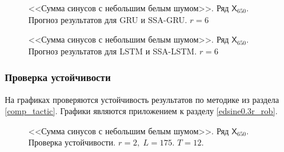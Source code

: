 \documentclass[specialist,
               substylefile = spbu.rtx,
               subf,href,colorlinks=true, 12p]{disser}
\begin{document}
\begin{figure}[H]
	\captionsetup{justification=centering}
	\caption{<<Сумма синусов с небольшим белым шумом>>. Ряд $\mathsf{X}_{650}$. Прогноз результатов для GRU и SSA-GRU. $r = 6$}
	\label{edsin0.3r_r6_res_gru}
\end{figure}

\begin{figure}[H]
	\captionsetup{justification=centering}
	\caption{<<Сумма синусов с небольшим белым шумом>>. Ряд $\mathsf{X}_{650}$. Прогноз результатов для LSTM и SSA-LSTM. $r = 6$}
	\label{edsin0.3r_r6_res_lstm}
\end{figure}

\subsubsection{Проверка устойчивости}
\label{aedsine0.3r_rob}
На графиках проверяются устойчивость результатов по методике из раздела \ref{comp_tactic}. Графики являются приложением к разделу \ref{edsine0.3r_rob}.

\begin{figure}[h]
	\captionsetup{justification=centering}
	\caption{<<Сумма синусов с небольшим белым шумом>>. Ряд $\mathsf{X}_{650}$. Проверка устойчивости. $r = 2, \; L = 175$. $T = 12$.}
	\label{edsine0.3r2.12}
\end{figure}
\end{document}
